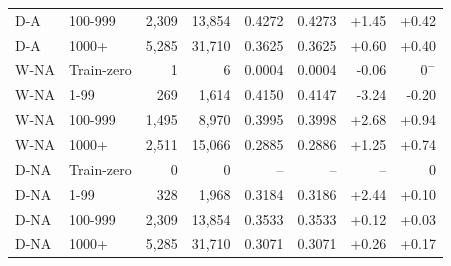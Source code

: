 \begin{table}[htbp]
\begin{tabular}{llrrrrrr}
D-A & 100-999 & 2,309 & 13,854 & 0.4272 & 0.4273 & +1.45 & +0.42\\
D-A & 1000+ & 5,285 & 31,710 & 0.3625 & 0.3625 & +0.60 & +0.40\\
W-NA & Train-zero & 1 & 6 & 0.0004 & 0.0004 & -0.06 & $0^{-}$\\
W-NA & 1-99 & 269 & 1,614 & 0.4150 & 0.4147 & -3.24 & -0.20\\
W-NA & 100-999 & 1,495 & 8,970 & 0.3995 & 0.3998 & +2.68 & +0.94\\
W-NA & 1000+ & 2,511 & 15,066 & 0.2885 & 0.2886 & +1.25 & +0.74\\
D-NA & Train-zero & 0 & 0 & -- & -- & -- & 0\\
D-NA & 1-99 & 328 & 1,968 & 0.3184 & 0.3186 & +2.44 & +0.10\\
D-NA & 100-999 & 2,309 & 13,854 & 0.3533 & 0.3533 & +0.12 & +0.03\\
D-NA & 1000+ & 5,285 & 31,710 & 0.3071 & 0.3071 & +0.26 & +0.17\\
\bottomrule
\end{tabular}
\end{table}
